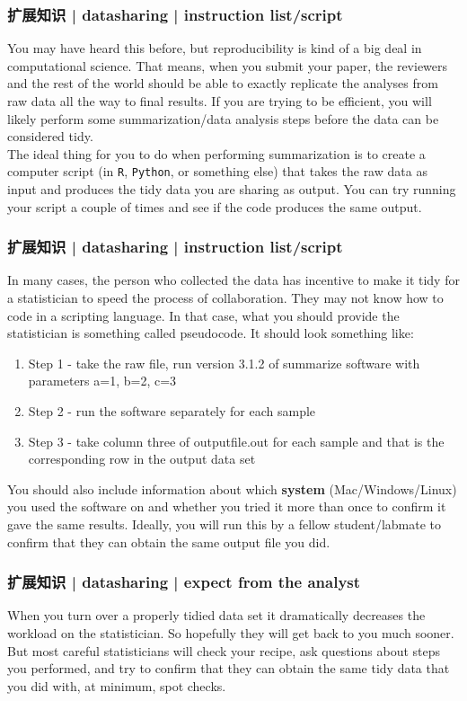 \begin{frame}[fragile]
  \frametitle{扩展知识 | datasharing | instruction list/script}
  You may have heard this before, but reproducibility is kind of a big deal in computational science. That means, when you submit your paper, the reviewers and the rest of the world should be able to exactly replicate the analyses from raw data all the way to final results. If you are trying to be efficient, you will likely perform some summarization/data analysis steps before the data can be considered tidy.\\
  \vspace{1em}
  The ideal thing for you to do when performing summarization is to create a computer script (in \verb|R|, \verb|Python|, or something else) that takes the raw data as input and produces the tidy data you are sharing as output. You can try running your script a couple of times and see if the code produces the same output. 
\end{frame}

\begin{frame}
  \frametitle{扩展知识 | datasharing | instruction list/script}
  In many cases, the person who collected the data has incentive to make it tidy for a statistician to speed the process of collaboration. They may not know how to code in a scripting language. In that case, what you should provide the statistician is something called pseudocode. It should look something like:
  \begin{enumerate}
    \item Step 1 - take the raw file, run version 3.1.2 of summarize software with parameters a=1, b=2, c=3
    \item Step 2 - run the software separately for each sample
    \item Step 3 - take column three of outputfile.out for each sample and that is the corresponding row in the output data set
  \end{enumerate}

  You should also include information about which \textbf{system} (Mac/Windows/Linux) you used the software on and whether you tried it more than once to confirm it gave the same results. Ideally, you will run this by a fellow student/labmate to confirm that they can obtain the same output file you did. 
\end{frame}

\begin{frame}
  \frametitle{扩展知识 | datasharing | expect from the analyst}
  When you turn over a properly tidied data set it dramatically decreases the workload on the statistician. So hopefully they will get back to you much sooner. But most careful statisticians will check your recipe, ask questions about steps you performed, and try to confirm that they can obtain the same tidy data that you did with, at minimum, spot checks.
\end{frame}

